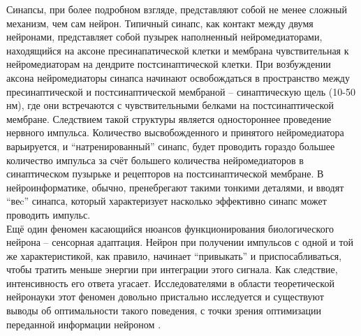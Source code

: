 \documentclass[a4paper,10pt]{article}
\begin{document}
\indent Синапсы, при более подробном взгляде, представляют собой не менее сложный механизм, чем сам нейрон. Типичный синапс, как контакт между двумя нейронами, представляет собой пузырек наполненный нейромедиаторами, находящийся на аксоне пресинапатической клетки и мембрана чувствительная к нейромедиаторам на дендрите постсинаптической клетки. При возбуждении аксона нейромедиаторы синапса начинают освобождаться в пространство между пресинаптической и постсинаптической мембраной -- синаптическую щель (10-50 нм), где они встречаются с чувствительными белками на постсинаптической мембране. Следствием такой структуры является одностороннее проведение нервного импульса. Количество высвобожденного и принятого нейромедиатора варьируется, и ``натренированный'' синапс, будет проводить гораздо большее количество импульса за счёт большего количества нейромедиаторов в синаптическом пузырьке и рецепторов на постсинаптической мембране. В нейроинформатике, обычно, пренебрегают такими тонкими деталями, и вводят ``веc'' синапса, который характеризует насколько эффективно синапс может проводить импульс.\\
\indent Ещё один феномен касающийся нюансов функционирования биологического нейрона -- сенсорная адаптация\cite{Phizi}. Нейрон при получении импульсов с одной и той же характеристикой, как правило, начинает ``привыкать'' и приспосабливаться, чтобы тратить меньше энергии при интеграции этого сигнала. Как следствие, интенсивность его ответа угасает. Исследователями в области теоретической нейронауки этот феномен довольно пристально исследуется и существуют выводы об оптимальности такого поведения, с точки зрения оптимизации переданной информации нейроном \cite{Adapt,TripleAdapt}.
\end{document}
